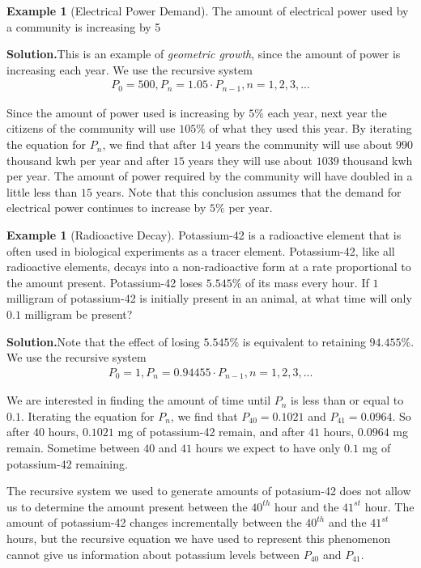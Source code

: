 \documentclass[10pt,]{book}
\theoremstyle{plain}
\theoremstyle{definition}
\theoremstyle{definition}
\newtheorem{example}[theorem]{Example}
\theoremstyle{definition}
\numberwithin{equation}{section}
\begin{document}
\begin{example}[Electrical Power Demand]\label{example-electrical-power-demand}
The amount of electrical power used by a community is increasing by 5%
\par\medskip\noindent%
\textbf{Solution.}\quad This is an example of \emph{geometric growth}, since the amount of power is increasing each year. We use the recursive system%
%
\begin{gather*}
P_0=500, P_n=1.05 \cdot P_{n-1}, n=1,2,3,...
\end{gather*}
\par
Since the amount of power used is increasing by \(5\%\) each year, next year the citizens of the community will use \(105\%\) of what they used this year.  By iterating the equation for \(P_n\), we find that after \(14\) years the community will use about \(990\) thousand kwh per year and after \(15\) years they will use about \(1039\) thousand kwh per year.  The amount of power required by the community will have doubled in a little less than \(15\) years.  Note that this conclusion assumes that the demand for electrical power continues to increase by \(5\%\) per year.%
\end{example}
\begin{example}[Radioactive Decay]\label{example-radioactive-decay}
Potassium-42 is a radioactive element that is often used in biological experiments as a tracer element.  Potassium-42, like all radioactive elements, decays into a non-radioactive form at a rate proportional to the amount present.  Potassium-42 loses \(5.545\%\) of its mass every hour.  If \(1\) milligram of potassium-42 is initially present in an animal, at what time will only \(0.1\) milligram be present?%
\par\medskip\noindent%
\textbf{Solution.}\quad Note that the effect of losing \(5.545\%\) is equivalent to retaining \(94.455\%\). We use the recursive system%
%
\begin{gather*}
P_0=1, P_n=0.94455 \cdot P_{n-1}, n=1,2,3,...
\end{gather*}
\par
We are interested in finding the amount of time until \(P_n\) is less than or equal to \(0.1\).  Iterating the equation for \(P_n\), we find that \(P_{40} = 0.1021\) and \(P_{41} = 0.0964\). So after \(40\) hours, \(0.1021\) mg of potassium-42 remain, and after \(41\) hours, \(0.0964\) mg remain. Sometime between \(40\) and \(41\) hours we expect to have only \(0.1\) mg of potassium-42 remaining.%
\par
The recursive system we used to generate amounts of potasium-42 does not allow us to determine the amount present between the \(40^{th}\) hour and the \(41^{st}\) hour.  The amount of potassium-42 changes incrementally between the \(40^{th}\) and the \(41^{st}\) hours, but the recursive equation we have used to represent this phenomenon cannot give us information about potassium levels between \(P_{40}\) and \(P_{41}\).%
\end{example}
\end{document}

